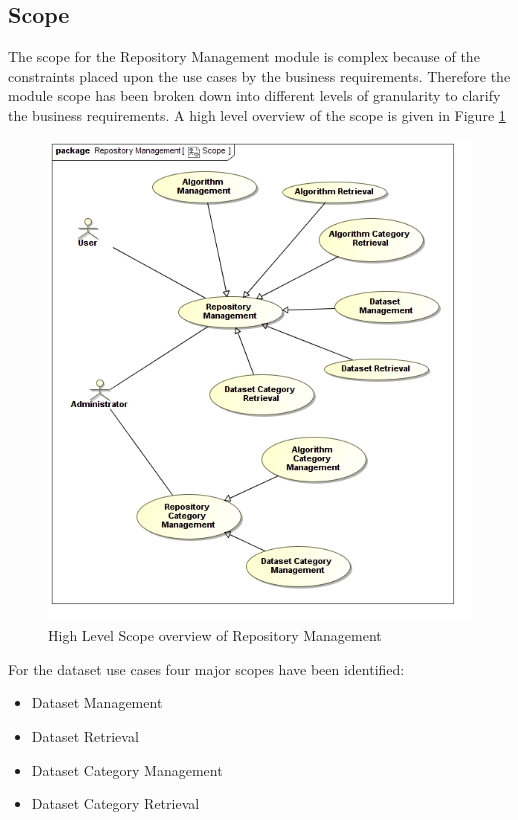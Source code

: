 \subsection{Scope}
The scope for the Repository Management module is complex because of the 
constraints placed upon the use cases by the business requirements. Therefore
the module scope has been broken down into different levels of granularity to
clarify the business requirements. A high level overview of the scope is given in
Figure \ref{fig:repositoryManagementHighLevelScope}
\begin{figure}[H]
  \begin{center}
  \includegraphics[scale=0.38]{../Diagrams and Charts/Repository Management/Scope.jpg}
  \caption{High Level Scope overview of Repository Management}
  \label{fig:repositoryManagementHighLevelScope}
  \end{center}  
\end{figure}

For the dataset use cases four major scopes have been identified:
\begin{itemize}
  \item Dataset Management
  \item Dataset Retrieval
  \item Dataset Category Management
  \item Dataset Category Retrieval
\end{itemize}



